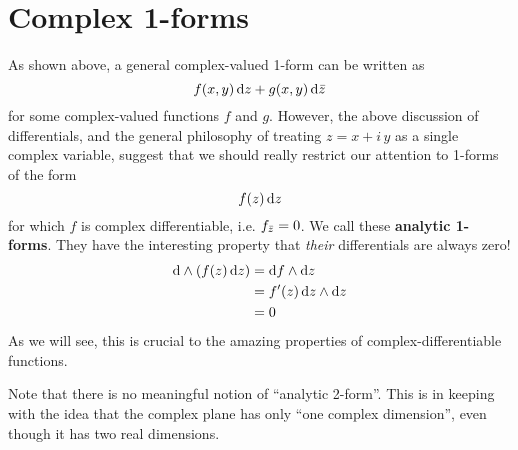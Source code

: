 \documentclass[12pt]{amsart}
\begin{document}
\section{Complex 1-forms}
\label{sec:complex-1-forms}

As shown above, a general complex-valued 1-form can be written as
\[f(x,y) \,{\mathrm{d} z} + g(x,y)\,{\mathrm{d} \bar{z}}\]
for some complex-valued functions $f$ and $g$.
However, the above discussion of differentials, and the general philosophy of treating $z=x+i\,y$ as a single complex variable, suggest that we should really restrict our attention to 1-forms of the form
\[ f(z)\,{\mathrm{d} z} \]
for which $f$ is complex differentiable, i.e. ${f}_{\bar{z}} = 0$.
We call these \textbf{analytic 1-forms}.
They have the interesting property that \emph{their} differentials are always zero!
\begin{align*}
  \mathrm{d}\wedge(f(z)\,{\mathrm{d} z}) &= {\mathrm{d} f} \wedge {\ensuremath{\mathrm{d} z}}\\
  &= f'(z)\, {\mathrm{d} z} \wedge {\ensuremath{\mathrm{d} z}}\\
  &= 0
\end{align*}
As we will see, this is crucial to the amazing properties of complex-differentiable functions.

Note that there is no meaningful notion of ``analytic 2-form''.
This is in keeping with the idea that the complex plane has only ``one complex dimension'', even though it has two real dimensions.
\end{document}
